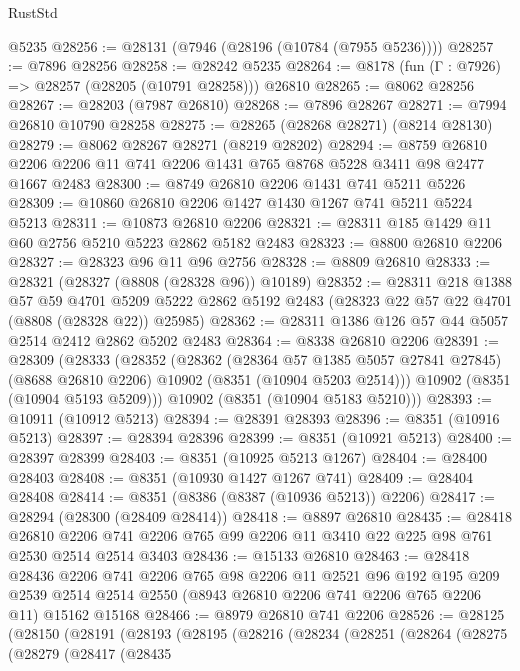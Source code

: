 \begin{lexlean}{RustStd}
\begin{coremodule}
    @5235
@28256 := @28131 (@7946 (@28196 (@10784 (@7955 @5236))))
@28257 := @7896 @28256
@28258 := @28242 @5235
@28264 := @8178 (fun (Γ : @7926) => @28257 (@28205 (@10791 @28258))) @26810
@28265 := @8062 @28256
@28267 := @28203 (@7987 @26810)
@28268 := @7896 @28267
@28271 := @7994 @26810 @10790 @28258
@28275 := @28265 (@28268 @28271) (@8214 @28130)
@28279 := @8062 @28267 @28271 (@8219 @28202)
@28294 := @8759 @26810 @2206 @2206 @11 @741 @2206 @1431 @765 @8768 @5228 @3411 @98 @2477 @1667 @2483
@28300 := @8749 @26810 @2206 @1431 @741 @5211 @5226
@28309 := @10860 @26810 @2206 @1427 @1430 @1267 @741 @5211 @5224 @5213
@28311 := @10873 @26810 @2206
@28321 := @28311 @185 @1429 @11 @60 @2756 @5210 @5223 @2862 @5182 @2483
@28323 := @8800 @26810 @2206
@28327 := @28323 @96 @11 @96 @2756
@28328 := @8809 @26810
@28333 := @28321 (@28327 (@8808 (@28328 @96)) @10189)
@28352 := @28311
    @218
    @1388
    @57
    @59
    @4701
    @5209
    @5222
    @2862
    @5192
    @2483
    (@28323 @22 @57 @22 @4701 (@8808 (@28328 @22)) @25985)
@28362 := @28311 @1386 @126 @57 @44 @5057 @2514 @2412 @2862 @5202 @2483
@28364 := @8338 @26810 @2206
@28391 := @28309
    (@28333
      (@28352
        (@28362
          (@28364 @57 @1385 @5057 @27841 @27845)
          (@8688 @26810 @2206)
          @10902
          (@8351 (@10904 @5203 @2514)))
        @10902
        (@8351 (@10904 @5193 @5209)))
      @10902
      (@8351 (@10904 @5183 @5210)))
@28393 := @10911 (@10912 @5213)
@28394 := @28391 @28393
@28396 := @8351 (@10916 @5213)
@28397 := @28394 @28396
@28399 := @8351 (@10921 @5213)
@28400 := @28397 @28399
@28403 := @8351 (@10925 @5213 @1267)
@28404 := @28400 @28403
@28408 := @8351 (@10930 @1427 @1267 @741)
@28409 := @28404 @28408
@28414 := @8351 (@8386 (@8387 (@10936 @5213)) @2206)
@28417 := @28294 (@28300 (@28409 @28414))
@28418 := @8897 @26810
@28435 := @28418
    @26810
    @2206
    @741
    @2206
    @765
    @99
    @2206
    @11
    @3410
    @22
    @225
    @98
    @761
    @2530
    @2514
    @2514
    @3403
@28436 := @15133 @26810
@28463 := @28418
    @28436
    @2206
    @741
    @2206
    @765
    @98
    @2206
    @11
    @2521
    @96
    @192
    @195
    @209
    @2539
    @2514
    @2514
    @2550
    (@8943 @26810 @2206 @741 @2206 @765 @2206 @11)
    @15162
    @15168
@28466 := @8979 @26810 @741 @2206
@28526 := @28125
    (@28150
      (@28191
        (@28193
          (@28195
            (@28216
              (@28234
                (@28251
                  (@28264
                    (@28275
                      (@28279
                        (@28417
                          (@28435

\end{coremodule}
\end{lexlean}
